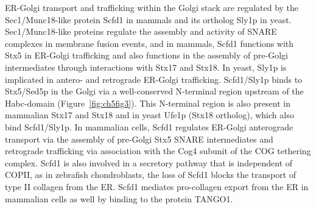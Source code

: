 ER-Golgi transport and trafficking within the Golgi stack are regulated by the Sec1/Munc18-like protein Scfd1 in mammals and its ortholog Sly1p in yeast. Sec1/Munc18-like proteins regulate the assembly and activity of SNARE complexes in membrane fusion events\cite{carr_at_2010}, and in mammals, Scfd1 functions with Stx5 in ER-Golgi trafficking and also functions in the assembly of pre-Golgi intermediates through interactions with Stx17 and Stx18\cite{rowe_role_1998,arac_three-dimensional_2005,bracher_structural_2002,yamaguchi_sly1_2002,li_structure-based_2005,dascher_mammalian_1996}. In yeast, Sly1p is implicated in antero- and retrograde ER-Golgi trafficking\cite{li_structure-based_2005}. Scfd1/Sly1p binds to Stx5/Sed5p in the Golgi via a well-conserved N-terminal region upstream of the Habc-domain (Figure~\ref{fig:ch5fig3})\cite{arac_three-dimensional_2005,bracher_structural_2002,yamaguchi_sly1_2002,li_structure-based_2005}. This N-terminal region is also present in mammalian Stx17 and Stx18 and in yeast Ufe1p (Stx18 ortholog), which also bind Scfd1/Sly1p. In mammalian cells, Scfd1 regulates ER-Golgi anterograde transport via the assembly of pre-Golgi Stx5 SNARE intermediates\cite{rowe_role_1998,yamaguchi_sly1_2002,dascher_mammalian_1996} and retrograde trafficking via association with the Cog4 subunit of the COG tethering complex\cite{laufman_direct_2009}. Scfd1 is also involved in a secretory pathway that is independent of COPII, as in zebrafish chondroblasts, the loss of Scfd1 blocks the transport of type II collagen from the ER\cite{hou_sec_2017}. Scfd1 mediates pro-collagen export from the ER in mammalian cells as well by binding to the protein TANGO1\cite{nogueira_sly1_2014}.

